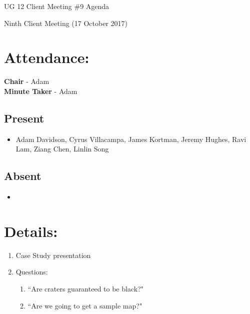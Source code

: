 \documentclass{article}
\begin{document}
\begin{adjustwidth}{2.5em}{0pt}
\begin{center}
\Large{UG 12 Client Meeting \#9 Agenda}\\
\end{center}
\end{adjustwidth}

Ninth Client Meeting (17 October 2017)
\section{Attendance:}
\textbf{Chair} - Adam\\
\textbf{Minute Taker} - Adam\\
\subsection*{Present}
\begin{itemize}
\item Adam Davidson, Cyrus Villacampa, James Kortman, Jeremy Hughes, Ravi Lam, Ziang Chen, Linlin Song
\end{itemize}
\subsection*{Absent}
\begin{itemize}
\item  
\end {itemize}

\section{Details:}
\begin{enumerate}
\item Case Study presentation
\item Questions:\begin{enumerate}
	\item “Are craters guaranteed to be black?"
	\item  “Are we going to get a sample map?" \end{enumerate}

\end{enumerate}
\end{document}
